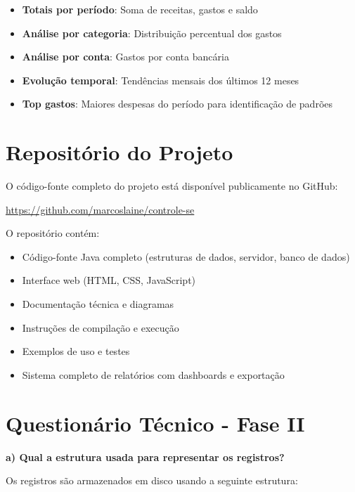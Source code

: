 \documentclass[12pt,a4paper]{article}
\begin{document}
\begin{itemize}
  \item \textbf{Totais por período}: Soma de receitas, gastos e saldo
  \item \textbf{Análise por categoria}: Distribuição percentual dos gastos
  \item \textbf{Análise por conta}: Gastos por conta bancária
  \item \textbf{Evolução temporal}: Tendências mensais dos últimos 12 meses
  \item \textbf{Top gastos}: Maiores despesas do período para identificação de padrões
\end{itemize}

\section{Repositório do Projeto}

O código-fonte completo do projeto está disponível publicamente no GitHub:

\begin{center}
\url{https://github.com/marcoslaine/controle-se}
\end{center}

\noindent O repositório contém:
\begin{itemize}
  \item Código-fonte Java completo (estruturas de dados, servidor, banco de dados)
  \item Interface web (HTML, CSS, JavaScript)
  \item Documentação técnica e diagramas
  \item Instruções de compilação e execução
  \item Exemplos de uso e testes
  \item Sistema completo de relatórios com dashboards e exportação
\end{itemize}

\section*{Questionário Técnico - Fase II}

\textbf{a) Qual a estrutura usada para representar os registros?}

Os registros são armazenados em disco usando a seguinte estrutura:
\end{document}
